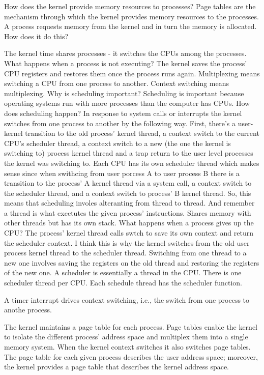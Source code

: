 \documentclass{amsbook}
\begin{document}
How does the kernel provide memory resources to processes? Page tables are the mechanism through which the kernel provides memory resources to the processes. A process requests memory from the kernel and in turn the memory is allocated. How does it do this? 

The kernel time shares processes - it switches the CPUs among the processes. What happens when a process is not executing? The kernel saves the process' CPU registers and restores them once the process runs again. Multiplexing means switching a CPU from one process to another. Context switching means multiplexing. Why is scheduling important? Scheduling is important because operating systems run with more processes than the computer has CPUs. How does scheduling happen? In response to system calls or interrupts the kernel switches from one process to another by the following way. First, there's a user-kernel transition to the old process' kernel thread, a context switch to the current CPU's scheduler thread, a context switch to a new (the one the kernel is switching to) process kernel thread and a trap return to the user level processes the kernel was switching to. Each CPU has its own scheduler thread which makes sense since when swithcing from user porcess A to user process B there is a transition to the process' A kernel thread via a system call, a context switch to the scheduler thread, and a context switch to process' B kernel thread. So, this means that scheduling involes alteranting from thread to thread. And remember a thread is what exectutes the given process' instructions. Shares memory with other threads but has its own stack. What happens when a process gives up the CPU? The process' kernel thread calls swtch to save its own context and return the scheduler context. I think this is why the kernel switches from the old user process kernel thread to the scheduler thread. Switching from one thread to a new one involves saving the registers on the old thread and restoring the registers of the new one. A scheduler is essentially a thread in the CPU. There is one scheduler thread per CPU. Each schedule thread has the scheduler function.

A timer interrupt drives context switching, i.e., the switch from one process to anothe process.

The kernel maintains a page table for each process. Page tables enable the kernel to isolate the different process' address space and multiplex them into a single memory system. When the kernel context switches it also switches page tables. The page table for each given process describes the user address space; moreover, the kernel provides a page table that describes the kernel address space.
\end{document}
